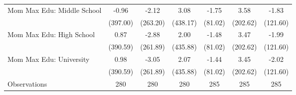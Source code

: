 {\begin{tabular}{l*{6}{c}}
\addlinespace
Mom Max Edu: Middle School&       -0.96         &       -2.12         &        3.08         &       -1.75         &        3.58         &       -1.83         \\
                    &    (397.00)         &    (263.20)         &    (438.17)         &     (81.02)         &    (202.62)         &    (121.60)         \\
\addlinespace
Mom Max Edu: High School&        0.87         &       -2.88         &        2.00         &       -1.48         &        3.47         &       -1.99         \\
                    &    (390.59)         &    (261.89)         &    (435.88)         &     (81.02)         &    (202.62)         &    (121.60)         \\
\addlinespace
Mom Max Edu: University&        0.98         &       -3.05         &        2.07         &       -1.44         &        3.45         &       -2.02         \\
                    &    (390.59)         &    (261.89)         &    (435.88)         &     (81.02)         &    (202.62)         &    (121.60)         \\
\midrule
Observations        &         280         &         280         &         280         &         285         &         285         &         285         \\
\bottomrule
\end{tabular}
}
